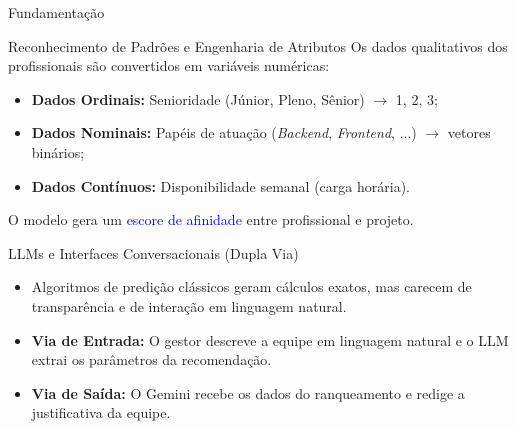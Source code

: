 \documentclass{beamer}
\begin{document}
\begin{frame}[allowframebreaks]{Fundamentação}
    \begin{block}{Reconhecimento de Padrões e Engenharia de Atributos}
        Os dados qualitativos dos profissionais são convertidos em variáveis numéricas:
        \begin{itemize}
            \item \textbf{Dados Ordinais:} Senioridade (Júnior, Pleno, Sênior) $\rightarrow$ 1, 2, 3;
            \item \textbf{Dados Nominais:} Papéis de atuação (\textit{Backend}, \textit{Frontend}, ...) $\rightarrow$ vetores binários;
            \item \textbf{Dados Contínuos:} Disponibilidade semanal (carga horária).
        \end{itemize}
        O modelo gera um \textcolor{blue}{escore de afinidade} entre profissional e projeto.
    \end{block}

    \framebreak

    \begin{block}{LLMs e Interfaces Conversacionais (Dupla Via)}
        \begin{itemize}
            \item Algoritmos de predição clássicos geram cálculos exatos, mas carecem de transparência e de interação em linguagem natural.
            \item \textbf{Via de Entrada:} O gestor descreve a equipe em linguagem natural e o LLM extrai os parâmetros da recomendação.
            \item \textbf{Via de Saída:} O Gemini recebe os dados do ranqueamento e redige a justificativa da equipe.
        \end{itemize}
    \end{block}
\end{frame}

\end{document}

